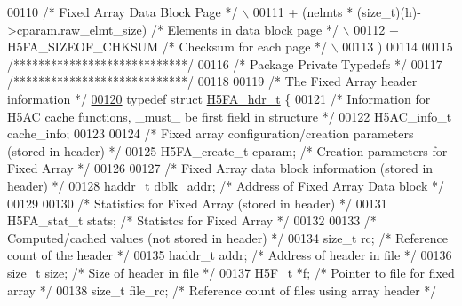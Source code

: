 \begin{DoxyCode}
00110 \textcolor{preprocessor}{    }\textcolor{comment}{/* Fixed Array Data Block Page */}\textcolor{preprocessor}{                         \(\backslash\)}
00111 \textcolor{preprocessor}{    + (nelmts * (size\_t)(h)->cparam.raw\_elmt\_size) }\textcolor{comment}{/* Elements in data block page */}\textcolor{preprocessor}{  \(\backslash\)}
00112 \textcolor{preprocessor}{    + H5FA\_SIZEOF\_CHKSUM                            }\textcolor{comment}{/* Checksum for each page */}\textcolor{preprocessor}{       \(\backslash\)}
00113 \textcolor{preprocessor}{    )}
00114 
00115 \textcolor{comment}{/****************************/}
00116 \textcolor{comment}{/* Package Private Typedefs */}
00117 \textcolor{comment}{/****************************/}
00118 
00119 \textcolor{comment}{/* The Fixed Array header information */}
\hyperlink{struct_h5_f_a__hdr__t}{00120} \textcolor{keyword}{typedef} \textcolor{keyword}{struct }\hyperlink{struct_h5_f_a__hdr__t}{H5FA\_hdr\_t} \{
00121     \textcolor{comment}{/* Information for H5AC cache functions, \_must\_ be first field in structure */}
00122     H5AC\_info\_t cache\_info;
00123 
00124     \textcolor{comment}{/* Fixed array configuration/creation parameters (stored in header) */}
00125     H5FA\_create\_t cparam;               \textcolor{comment}{/* Creation parameters for Fixed Array */}
00126 
00127     \textcolor{comment}{/* Fixed Array data block information (stored in header) */}
00128     haddr\_t dblk\_addr;                   \textcolor{comment}{/* Address of Fixed Array Data block */}
00129 
00130     \textcolor{comment}{/* Statistics for Fixed Array (stored in header) */}
00131     H5FA\_stat\_t stats;                  \textcolor{comment}{/* Statistcs for Fixed Array */}
00132 
00133     \textcolor{comment}{/* Computed/cached values (not stored in header) */}
00134     \textcolor{keywordtype}{size\_t} rc;                          \textcolor{comment}{/* Reference count of the header                                */}
00135     haddr\_t addr;                       \textcolor{comment}{/* Address of header in file                                    */}
00136     \textcolor{keywordtype}{size\_t} size;                        \textcolor{comment}{/* Size of header in file                                       */}
00137     \hyperlink{struct_h5_f__t}{H5F\_t} *f;                           \textcolor{comment}{/* Pointer to file for fixed array                            
        */}
00138     \textcolor{keywordtype}{size\_t} file\_rc;                     \textcolor{comment}{/* Reference count of files using array header                  */}

\end{DoxyCode}
